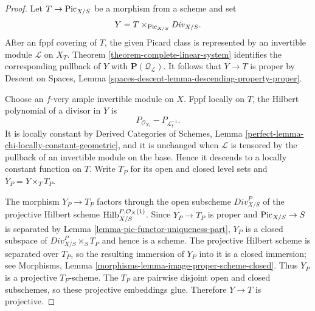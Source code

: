 \begin{proof}
Let $T \to \mathrm{Pic}_{X/S}$ be a morphism from a scheme and set
$$
Y = T \times_{\mathrm{Pic}_{X/S}} \mathit{Div}_{X/S}.
$$
After an fppf covering of $T$, the given Picard class is represented by an
invertible module $\mathcal{L}$ on $X_T$. Theorem
\ref{theorem-complete-linear-system} identifies the corresponding pullback
of $Y$ with $\mathbf{P}(\mathcal{Q}_{\mathcal{L}})$. It follows that
$Y \to T$ is proper by Descent on Spaces, Lemma
\ref{spaces-descent-lemma-descending-property-proper}.

Choose an $f$-very ample invertible module on $X$. Fppf locally on $T$, the
Hilbert polynomial of a divisor in $Y$ is
$$
P_{\mathcal{O}_{X_t}} - P_{\mathcal{L}_t^{-1}}.
$$
It is locally constant by Derived Categories of Schemes, Lemma
\ref{perfect-lemma-chi-locally-constant-geometric}, and it is unchanged when
$\mathcal{L}$ is tensored by the pullback of an invertible module on the
base. Hence it descends to a locally constant function on $T$. Write $T_P$
for its open and closed level sets and $Y_P = Y \times_T T_P$.

The morphism $Y_P \to T_P$ factors through the open subscheme
$\mathit{Div}^P_{X/S}$ of the projective Hilbert scheme
$\mathrm{Hilb}^{P, \mathcal{O}_X(1)}_{X/S}$. Since $Y_P \to T_P$ is proper
and $\mathrm{Pic}_{X/S} \to S$ is separated by Lemma
\ref{lemma-pic-functor-uniqueness-part}, $Y_P$ is a closed subspace of
$\mathit{Div}^P_{X/S} \times_S T_P$ and hence is a scheme. The projective
Hilbert scheme is separated over $T_P$, so the resulting immersion of
$Y_P$ into it is a closed immersion; see Morphisms, Lemma
\ref{morphisms-lemma-image-proper-scheme-closed}. Thus $Y_P$ is a projective
$T_P$-scheme. The $T_P$ are pairwise disjoint open and closed subschemes, so
these projective embeddings glue. Therefore $Y \to T$ is projective.
\end{proof}

